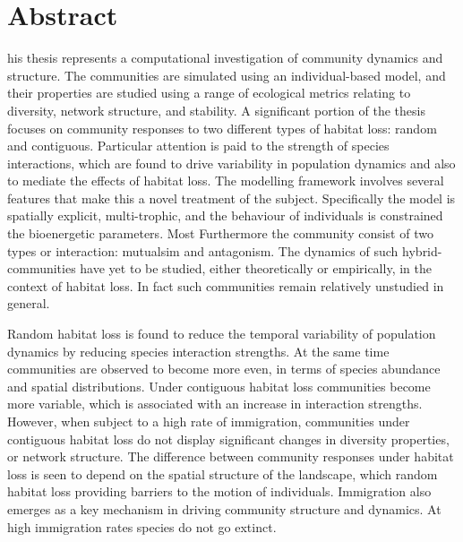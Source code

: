 %
%
%

\chapter*{Abstract}
\begin{SingleSpace}
his thesis represents a computational investigation of community dynamics and structure. The communities are simulated using an individual-based model, and their properties are studied using a range of ecological metrics relating to diversity, network structure, and stability. A significant portion of the thesis focuses on community responses to two different types of habitat loss: random and contiguous. Particular attention is paid to the strength of species interactions, which are found to drive variability in population dynamics and also to mediate the effects of habitat loss. The modelling framework involves several features that make this a novel treatment of the subject. Specifically the model is spatially explicit, multi-trophic, and the behaviour of individuals is constrained the bioenergetic parameters. Most Furthermore the community consist of two types or interaction: mutualsim and antagonism. The dynamics of such hybrid-communities have yet to be studied, either theoretically or empirically, in the context of habitat loss. In fact such communities remain relatively unstudied in general.

Random habitat loss is found to reduce the temporal variability of population dynamics by reducing species interaction strengths. At the same time communities are observed to become more even, in terms of species abundance and spatial distributions. Under contiguous habitat loss communities become more variable, which is associated with an increase in interaction strengths. However, when subject to a high rate of immigration, communities under contiguous habitat loss do not display significant changes in diversity properties, or network structure.  The difference between community responses under habitat loss is seen to depend on the spatial structure of the landscape, which random habitat loss providing barriers to the motion of individuals. Immigration also emerges as a key mechanism in driving community structure and dynamics. At high immigration rates species do not go extinct.


\end{SingleSpace}
